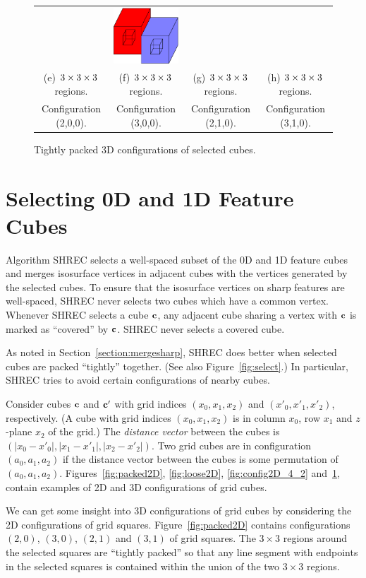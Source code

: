 \begin{figure}
\begin{tabular}{cccc}
\qquad &
\qquad
\includegraphics[width=1.2in]{images/config3D_3_1_0_3x3x3.eps} \\
(e) $3 \times 3 \times 3$ regions. & (f) $3 \times 3 \times 3$ regions. 
  & (g) $3 \times 3 \times 3$ regions. & (h) $3 \times 3 \times 3$ regions.\\
Configuration (2,0,0). & Configuration (3,0,0). 
  & Configuration (2,1,0). & Configuration (3,1,0).
\end{tabular}
\caption{Tightly packed 3D configurations of selected cubes.}
\label{fig:packed3D}
\end{figure}


\section{Selecting 0D and 1D Feature Cubes}
\label{section:selection}

Algorithm SHREC selects a well-spaced subset 
of the 0D and 1D feature cubes
and merges isosurface vertices in adjacent cubes 
with the vertices generated by the selected cubes.
To ensure that the isosurface vertices on sharp features are well-spaced,
SHREC never selects two cubes which have a common vertex.
Whenever SHREC selects a cube $\mathbf{c}$,
any adjacent cube sharing a vertex with $\mathbf{c}$ is marked as ``covered''
by $\mathbf{c}$.
SHREC never selects a covered cube.

As noted in Section~\ref{section:mergesharp}, 
SHREC does better when selected cubes 
are packed ``tightly'' together.
(See also Figure~\ref{fig:select}.)
In particular, SHREC tries to avoid certain configurations of nearby cubes.

Consider cubes $\mathbf{c}$ and $\mathbf{c}'$ with grid indices $(x_0,x_1,x_2)$
and $(x'_0,x'_1,x'_2)$, respectively.
(A cube with grid indices $(x_0,x_1,x_2)$ is in column $x_0$, row $x_1$
and $z$-plane $x_2$ of the grid.)
The {\em distance vector} between the cubes is
$(|x_0-x'_0|, |x_1-x'_1|, |x_2-x'_2|)$.
Two grid cubes are in configuration $(a_0,a_1,a_2)$ if the distance vector
between the cubes is some permutation of $(a_0,a_1,a_2)$.
Figures~\ref{fig:packed2D}, \ref{fig:loose2D}, \ref{fig:config2D_4_2}
and~\ref{fig:packed3D},
contain examples of 2D and 3D configurations of grid cubes.

We can get some insight into 3D configurations of grid cubes
by considering the 2D configurations of grid squares.
Figure~\ref{fig:packed2D} contains configurations $(2,0)$, $(3,0)$,
$(2,1)$ and $(3,1)$ of grid squares.
The $3 \times 3$ regions around the selected squares are ``tightly packed''
so that any line segment with endpoints in the selected squares
is contained within the union of the two $3 \times 3$ regions.

